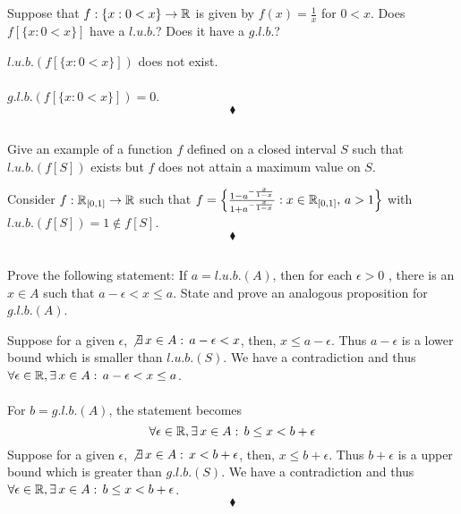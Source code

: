\subsection{}
\begin{tcolorbox}
Suppose that $f: \{x :0 < x\}\rightarrow\mathbb{R}$ is given by $f (x)= \frac{1}{x}$  for $0 < x$. Does $f [\{x : 0 < x\}]$ have a $l.u.b.$? Does it have a $g.l.b.$? 
\end{tcolorbox}
$$ $$ 
$l.u.b. (f [\{x : 0 < x\}])$ does not exist.\\\\
$g.l.b. (f [\{x : 0 < x\}])=0$.
$$\blacklozenge$$

\subsection{}
\begin{tcolorbox}
Give an example of a function $f$ defined on a closed interval $S$ such that $l.u.b. (f [S])$ exists but $f$ does not attain a maximum value on $S$.
\end{tcolorbox}
Consider $f:\mathbb{R}_{[0,1]}\rightarrow \mathbb{R}$ such that $f=\left\{\frac{1-a^{-\frac{x}{1-x}}}{1+a^{-\frac{x}{1-x}}}:x\in \mathbb{R}_{[0,1]},\, a>1 \right\}$ with $l.u.b. (f [S])=1\not\in f [S]$.
$$\blacklozenge$$

\subsection{}
\begin{tcolorbox}
Prove the following statement: If $a = l.u.b. (A)$, then for each $\epsilon > 0$ , there is an $x \in  A$ such that $a-\epsilon < x \leq a$. State and prove an analogous proposition for $g.l.b. (A)$. 
\end{tcolorbox}
Suppose for a given $\epsilon$,  $\not\exists\, x\in A:\, a-\epsilon < x$, then, $x\leq a-\epsilon$. Thus $a-\epsilon$ is a lower bound which is smaller than $l.u.b.(S)$. We have a contradiction and thus $\forall\epsilon\in\mathbb{R}, \exists\, x\in A:\, a-\epsilon < x \leq a$.\\\\
For $b= g.l.b. (A)$, the statement becomes $$\forall\epsilon\in\mathbb{R}, \exists\, x\in A:\, b\leq  x < b+\epsilon$$
Suppose for a given $\epsilon$,  $\not\exists\, x\in A:\, x < b+\epsilon$, then, $x \leq b+\epsilon$. Thus $b+\epsilon$ is a upper bound which is greater than $g.l.b.(S)$. We have a contradiction and thus $\forall\epsilon\in\mathbb{R}, \exists\, x\in A:\, b\leq  x < b+\epsilon$.
$$\blacklozenge$$

